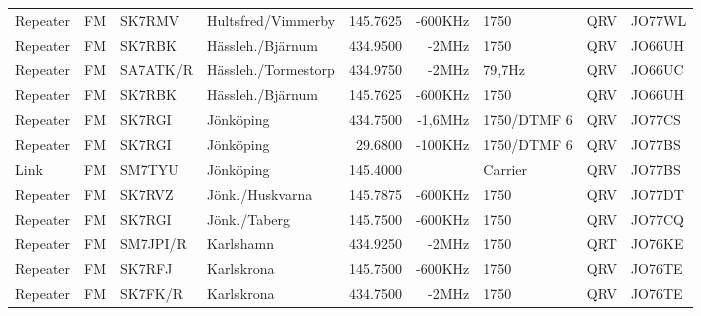 \begin{landscape}
\begin{longtable}{llllrrlcl}
	Repeater                  & FM            & SK7RMV        & Hultsfred/Vimmerby  & 145.7625          & -600KHz        & 1750             & QRV             & JO77WL           \\
	Repeater                  & FM            & SK7RBK        & Hässleh./Bjärnum    & 434.9500          & -2MHz          & 1750             & QRV             & JO66UH           \\
	Repeater                  & FM            & SA7ATK/R      & Hässleh./Tormestorp & 434.9750          & -2MHz          & 79,7Hz           & QRV             & JO66UC           \\
	Repeater                  & FM            & SK7RBK        & Hässleh./Bjärnum    & 145.7625          & -600KHz        & 1750             & QRV             & JO66UH           \\
	Repeater                  & FM            & SK7RGI        & Jönköping           & 434.7500          & -1,6MHz        & 1750/DTMF 6      & QRV             & JO77CS           \\
	Repeater                  & FM            & SK7RGI        & Jönköping           & 29.6800           & -100KHz        & 1750/DTMF 6      & QRV             & JO77BS           \\
	Link                      & FM            & SM7TYU        & Jönköping           & 145.4000          &                & Carrier          & QRV             & JO77BS           \\
	Repeater                  & FM            & SK7RVZ        & Jönk./Huskvarna     & 145.7875          & -600KHz        & 1750             & QRV             & JO77DT           \\
	Repeater                  & FM            & SK7RGI        & Jönk./Taberg        & 145.7500          & -600KHz        & 1750             & QRV             & JO77CQ           \\
	Repeater                  & FM            & SM7JPI/R      & Karlshamn           & 434.9250          & -2MHz          & 1750             & QRT             & JO76KE           \\
	Repeater                  & FM            & SK7RFJ        & Karlskrona          & 145.7500          & -600KHz        & 1750             & QRV             & JO76TE           \\
	Repeater                  & FM            & SK7FK/R       & Karlskrona          & 434.7500          & -2MHz          & 1750             & QRV             & JO76TE           \\

\end{longtable}
\end{landscape}
